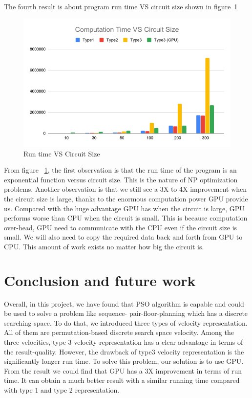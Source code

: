 \documentclass{article}
\begin{document}
The fourth result is about program run time VS circuit size shown in figure~\ref{fig:TVS}

\begin{figure}[H]
\centering
\includegraphics[width=1\linewidth]{TimeVSsize.png}
\caption{Run time VS Circuit Size}
\label{fig:TVS}
\end{figure}

From figure ~\ref{fig:TVS}, the first observation is that the run time of the program is an exponential function versus circuit size. This is the nature of NP optimization problems. Another observation is that we still see a 3X to 4X improvement when the circuit size is large, thanks to the enormous computation power GPU provide us. Compared with the huge advantage GPU has when the circuit is large, GPU performs worse than CPU when the circuit is small. This is because computation over-head, GPU need to communicate with the CPU even if the circuit size is small. We will also need to copy the required data back and forth from GPU to CPU. This amount of work exists no matter how big the circuit is.

\section{Conclusion and future work}
\label{sec:org2e01f19}
Overall, in this project, we have found that PSO\cite{PSO} algorithm is capable and could be used to solve a problem like sequence- pair-floor-planning which has a discrete searching space. To do that, we introduced three types of velocity representation. All of them are permutation-based discrete search space velocity. Among the three velocities, type 3 velocity representation has a clear advantage in terms of the result-quality. However, the drawback of type3 velocity representation is the significantly longer run time. To solve this problem, our solution is to use GPU. From the result we could find that GPU has a 3X improvement in terms of run time. It can obtain a much better result with a similar running time compared with type 1 and type 2 representation.
\end{document}
